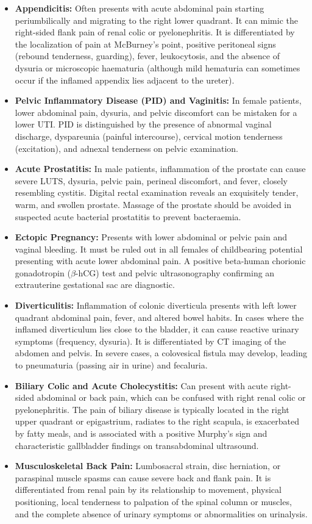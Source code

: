 \begin{itemize}
    \item \textbf{Appendicitis:} Often presents with acute abdominal pain starting periumbilically and migrating to the right lower quadrant. It can mimic the right-sided flank pain of renal colic or pyelonephritis. It is differentiated by the localization of pain at McBurney's point, positive peritoneal signs (rebound tenderness, guarding), fever, leukocytosis, and the absence of dysuria or microscopic haematuria (although mild hematuria can sometimes occur if the inflamed appendix lies adjacent to the ureter).
    \item \textbf{Pelvic Inflammatory Disease (PID) and Vaginitis:} In female patients, lower abdominal pain, dysuria, and pelvic discomfort can be mistaken for a lower UTI. PID is distinguished by the presence of abnormal vaginal discharge, dyspareunia (painful intercourse), cervical motion tenderness (excitation), and adnexal tenderness on pelvic examination.
    \item \textbf{Acute Prostatitis:} In male patients, inflammation of the prostate can cause severe LUTS, dysuria, pelvic pain, perineal discomfort, and fever, closely resembling cystitis. Digital rectal examination reveals an exquisitely tender, warm, and swollen prostate. Massage of the prostate should be avoided in suspected acute bacterial prostatitis to prevent bacteraemia.
    \item \textbf{Ectopic Pregnancy:} Presents with lower abdominal or pelvic pain and vaginal bleeding. It must be ruled out in all females of childbearing potential presenting with acute lower abdominal pain. A positive beta-human chorionic gonadotropin ($\beta$-hCG) test and pelvic ultrasonography confirming an extrauterine gestational sac are diagnostic.
    \item \textbf{Diverticulitis:} Inflammation of colonic diverticula presents with left lower quadrant abdominal pain, fever, and altered bowel habits. In cases where the inflamed diverticulum lies close to the bladder, it can cause reactive urinary symptoms (frequency, dysuria). It is differentiated by CT imaging of the abdomen and pelvis. In severe cases, a colovesical fistula may develop, leading to pneumaturia (passing air in urine) and fecaluria.
    \item \textbf{Biliary Colic and Acute Cholecystitis:} Can present with acute right-sided abdominal or back pain, which can be confused with right renal colic or pyelonephritis. The pain of biliary disease is typically located in the right upper quadrant or epigastrium, radiates to the right scapula, is exacerbated by fatty meals, and is associated with a positive Murphy's sign and characteristic gallbladder findings on transabdominal ultrasound.
    \item \textbf{Musculoskeletal Back Pain:} Lumbosacral strain, disc herniation, or paraspinal muscle spasms can cause severe back and flank pain. It is differentiated from renal pain by its relationship to movement, physical positioning, local tenderness to palpation of the spinal column or muscles, and the complete absence of urinary symptoms or abnormalities on urinalysis.
\end{itemize}

